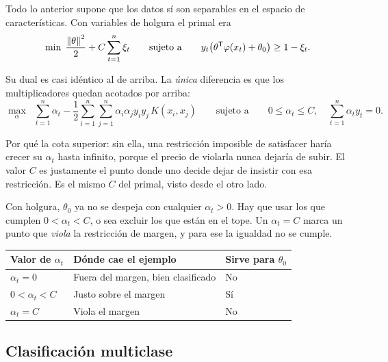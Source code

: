 \documentclass[11pt,letterpaper]{article}
\begin{document}
Todo lo anterior supone que los datos sí son separables en el espacio
de características. Con variables de holgura el primal era
\[
    \min \; \frac{\left\lVert \theta \right\rVert^{2}}{2} + C \sum_{t=1}^{n} \xi_t
    \qquad \text{sujeto a} \qquad
    y_t\big(\theta^{\mathsf{T}}\varphi(x_t) + \theta_0\big)
    \geq 1 - \xi_t .
\]

Su dual es casi idéntico al de arriba. La \emph{única} diferencia es
que los multiplicadores quedan acotados por arriba:
\[
    \max_{\alpha} \;\; \sum_{t=1}^{n} \alpha_t
    - \frac{1}{2} \sum_{i=1}^{n} \sum_{j=1}^{n}
      \alpha_i \alpha_j y_i y_j\, K(x_i, x_j)
    \qquad \text{sujeto a} \qquad
    0 \leq \alpha_t \leq C ,
    \quad \sum_{t=1}^{n} \alpha_t y_t = 0 .
\]

\begin{idea}
  Por qué la cota superior: sin ella, una restricción imposible de
  satisfacer haría crecer su $\alpha_t$ hasta infinito, porque el
  precio de violarla nunca dejaría de subir. El valor $C$ es
  justamente el punto donde uno decide dejar de insistir con esa
  restricción. Es el mismo $C$ del primal, visto desde el otro lado.
\end{idea}

\begin{ojo}
  Con holgura, $\theta_0$ ya no se despeja con cualquier $\alpha_t > 0$.
  Hay que usar los que cumplen $0 < \alpha_t < C$, o sea excluir los
  que están en el tope. Un $\alpha_t = C$ marca un punto que
  \emph{viola} la restricción de margen, y para ese la igualdad no se
  cumple.
\end{ojo}

\begin{center}
\begin{tabular}{lll}
    \toprule
    \textbf{Valor de $\alpha_t$} & \textbf{Dónde cae el ejemplo} &
      \textbf{Sirve para $\theta_0$} \\
    \midrule
    $\alpha_t = 0$     & Fuera del margen, bien clasificado & No \\
    $0 < \alpha_t < C$ & Justo sobre el margen              & Sí \\
    $\alpha_t = C$     & Viola el margen                    & No \\
    \bottomrule
\end{tabular}
\end{center}


\subsection*{Clasificación multiclase}
\end{document}
